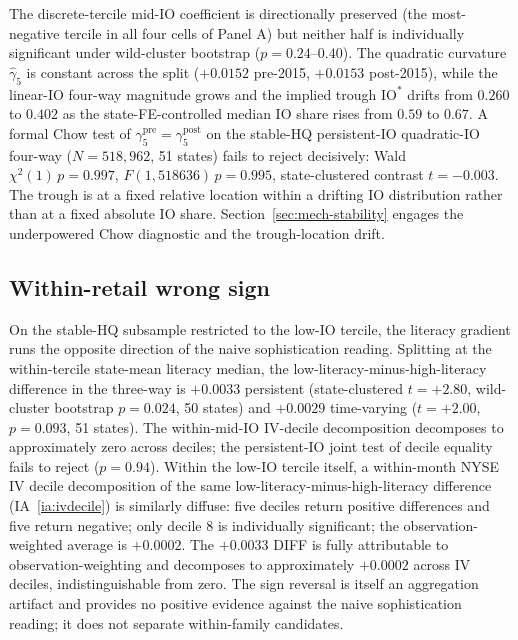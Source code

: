 The discrete-tercile mid-IO coefficient is directionally preserved (the most-negative tercile in all four cells of Panel A) but neither half is individually significant under wild-cluster bootstrap ($p = 0.24$--$0.40$). The quadratic curvature $\hat\gamma_{5}$ is constant across the split ($+0.0152$ pre-2015, $+0.0153$ post-2015), while the linear-IO four-way magnitude grows and the implied trough $\mathrm{IO}^{\ast}$ drifts from $0.260$ to $0.402$ as the state-FE-controlled median IO share rises from $0.59$ to $0.67$. A formal Chow test of $\gamma_{5}^{\text{pre}} = \gamma_{5}^{\text{post}}$ on the stable-HQ persistent-IO quadratic-IO four-way ($N = 518{,}962$, 51 states) fails to reject decisively: Wald $\chi^{2}(1)\,p = 0.997$, $F(1, 518636)\,p = 0.995$, state-clustered contrast $t = -0.003$. The trough is at a fixed relative location within a drifting IO distribution rather than at a fixed absolute IO share. Section~\ref{sec:mech-stability} engages the underpowered Chow diagnostic and the trough-location drift.

\subsection{Within-retail wrong sign}
\label{sec:withinretail}

On the stable-HQ subsample restricted to the low-IO tercile, the literacy gradient runs the opposite direction of the naive sophistication reading. Splitting at the within-tercile state-mean literacy median, the low-literacy-minus-high-literacy difference in the three-way is $+0.0033$ persistent (state-clustered $t = +2.80$, wild-cluster bootstrap $p = 0.024$, 50 states) and $+0.0029$ time-varying ($t = +2.00$, $p = 0.093$, 51 states). The within-mid-IO IV-decile decomposition decomposes to approximately zero across deciles; the persistent-IO joint test of decile equality fails to reject ($p = 0.94$). Within the low-IO tercile itself, a within-month NYSE IV decile decomposition of the same low-literacy-minus-high-literacy difference (IA~\ref{ia:ivdecile}) is similarly diffuse: five deciles return positive differences and five return negative; only decile 8 is individually significant; the observation-weighted average is $+0.0002$. The $+0.0033$ DIFF is fully attributable to observation-weighting and decomposes to approximately $+0.0002$ across IV deciles, indistinguishable from zero. The sign reversal is itself an aggregation artifact and provides no positive evidence against the naive sophistication reading; it does not separate within-family candidates.

